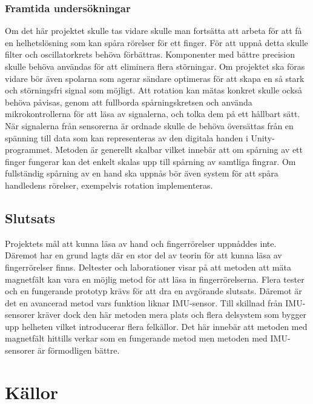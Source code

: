 \documentclass[a4paper]{article}
\makeatletter
\let\\\@raggedtwoe@savedcr%
\makeatother
\begin{document}
\begin{sloppypar}
    \subsubsection{Framtida undersökningar}
    Om det här projektet skulle tas vidare skulle man fortsätta att arbeta för att få en helhetslösning som kan spåra
    rörelser för ett finger. För att uppnå detta skulle filter och oscillatorkrets behöva förbättras. Komponenter med
    bättre precision skulle behöva användas för att eliminera flera störningar. Om projektet ska föras vidare bör även
    spolarna som agerar sändare optimeras för att skapa en så stark och störningsfri signal som möjligt.
    Att rotation kan mätas konkret skulle också behöva påvisas, genom att fullborda spårningskretsen och använda mikrokontrollerna för att läsa av signalerna, och tolka dem på ett hållbart sätt.
    \\\\
    När signalerna från sensorerna är ordnade skulle de behöva översättas från en spänning till data som kan representeras
    av den digitala handen i Unity-programmet. Metoden är generellt skalbar vilket innebär att om spårning av ett finger
    fungerar kan det enkelt skalas upp till spårning av samtliga fingrar. Om fullständig spårning av en hand ska uppnås bör
    även system för att spåra handledens rörelser, exempelvis rotation implementeras.
    \subsection{Slutsats}
    Projektets mål att kunna läsa av hand och fingerrörelser uppnåddes inte. Däremot har en grund lagts där en stor del av
    teorin för att kunna läsa av fingerrörelser finns. Deltester och laborationer visar på att metoden att mäta magnetfält
    kan vara en möjlig metod för att läsa in fingerrörelserna. Flera tester och en fungerande prototyp krävs för att dra
    en avgörande slutsats. Däremot är det en avancerad metod vars funktion liknar IMU-sensor. Till skillnad från IMU-sensorer
    kräver dock den här metoden mera plats och flera delsystem som bygger upp helheten vilket introducerar flera felkällor.
    Det här innebär att metoden med magnetfält hittills verkar som en fungerande metod men metoden med IMU-sensorer är
    förmodligen bättre.


    \newpage

    \section{Källor}
    \printbibliography[heading=none]



\end{sloppypar}
\end{document}
